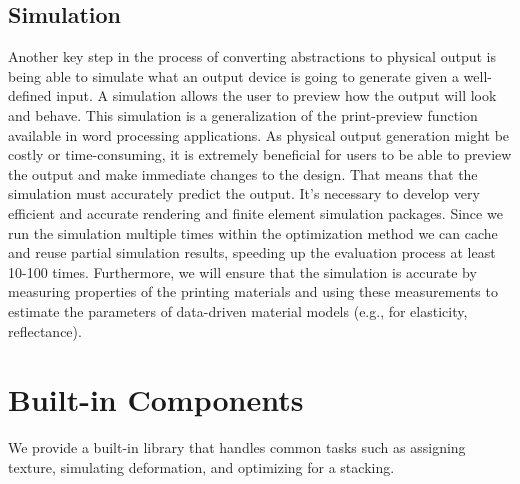 \documentclass[annual]{acmsiggraph}
\begin{document}
\subsection{Simulation}
Another key step in the process of converting abstractions to physical output is being able to
simulate what an output device is going to generate given a well-defined input. 
A simulation allows the user to preview how the output will look and behave. 
This simulation is a generalization of the print-preview function
available in word processing applications.
As physical output generation might be costly or time-consuming, 
it is extremely beneficial for users to be able to preview the output and make immediate changes to the design.
That means that the simulation must accurately predict the output. 
It's necessary to develop very efficient and accurate rendering
and finite element simulation packages. Since we run the simulation multiple times within the optimization method
we can cache and reuse partial simulation results, speeding up the evaluation process at least 10-100 times.
Furthermore, we will ensure that the simulation is accurate by measuring properties of the printing materials and using
these measurements to estimate the parameters of data-driven material models (e.g., for elasticity, reflectance).

\section{Built-in Components}
We provide a built-in library that handles common tasks such as assigning texture,
simulating deformation, and optimizing for a stacking.
\end{document}
